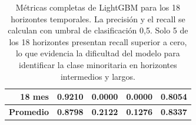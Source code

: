 \begin{table}[h!]
\begin{tabular}{|r|r|r|r|r|}
    \hline
        18 mes & 0.9210 & 0.0000 & 0.0000 & 0.8054 \\
    \hline
        \textbf{Promedio} & \textbf{0.8798} & \textbf{0.2122} & \textbf{0.1276} & \textbf{0.8337} \\
    \hline
    \end{tabular}
    \caption{Métricas completas de LightGBM para los 18 horizontes temporales. La precisión y el recall se calculan con umbral de clasificación 0,5. Solo 5 de los 18 horizontes presentan recall superior a cero, lo que evidencia la dificultad del modelo para identificar la clase minoritaria en horizontes intermedios y largos.}
    \label{tab:lgbm_18h}
\end{table}
